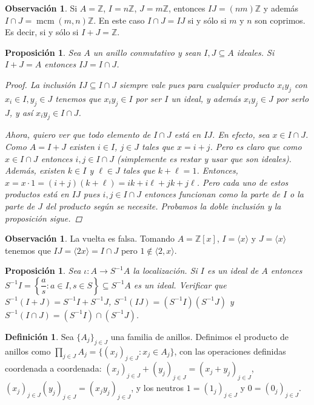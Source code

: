 \documentclass[12pt]{book}
\newtheorem{prop}[teo]{Proposición}
\theoremstyle{definition}
\newtheorem{obs}[teo]{Observación}
\newtheorem{defn}[teo]{Definición}
\newcommand{\ZZ}{\mathbb{Z}}      %
\DeclareMathOperator{\mcm}{mcm}
\begin{document}
\begin{obs}
Si $A=\ZZ$, $I=n\ZZ$, $J=m\ZZ$, entonces $IJ=(nm)\ZZ$ y además $I\cap J = \mcm (m,n)\ZZ$. En este caso $I\cap J=IJ$ si y sólo si $m$ y $n$ son coprimos. Es decir, si y sólo si $I+J=\ZZ$.
\end{obs}

\begin{prop}
Sea $A$ un anillo conmutativo y sean $I,J\subseteq A$ ideales. Si $I+J=A$ entonces $IJ=I\cap J$.
\begin{proof}
La inclusión $IJ\subseteq I\cap J$ siempre vale pues para cualquier producto $x_iy_j$ con $x_i\in I, y_j\in J$ tenemos que $x_i y_j\in I$ por ser $I$ un ideal, y además $x_iy_j\in J$ por serlo $J$, y así $x_iy_j\in I\cap J$.

Ahora, quiero ver que todo elemento de $I\cap J$ está en $IJ$. En efecto, sea $x\in I\cap J$. Como $A=I+J$ existen $i\in I$, $j\in J$ tales que $x = i+j$. Pero es claro que como $x\in I\cap J$ entonces $i,j\in I\cap J$ (simplemente es restar y usar que son ideales). Además, existen $k\in I$ y $\ell\in J$ tales que $k+\ell = 1$. Entonces, $x = x\cdot 1 = (i+j)(k+\ell) = ik + i\ell + jk + j\ell$. Pero cada uno de estos productos está en $IJ$ pues $i,j\in I\cap J$ entonces funcionan como la parte de $I$ o la parte de $J$ del producto según se necesite. Probamos la doble inclusión y la proposición sigue.

\end{proof}
\end{prop}

\begin{obs}
La vuelta es falsa. Tomando $A=\ZZ[x]$, $I=\langle x\rangle$ y $J=\langle x\rangle$ tenemos que $IJ=\langle 2x\rangle = I\cap J$ pero $1\notin \langle 2,x\rangle$.
\end{obs}


\begin{prop}
Sea $\iota:A\to S^{-1}A$ la localización. Si $I$ es un ideal de $A$ entonces $S^{-1}I = \left\{\dfrac{a}{s}:a\in I, s\in S\right\}\subseteq S^{-1}A$ es un ideal. Verificar que $S^{-1}(I+J) = S^{-1}I + S^{-1}J$, $S^{-1}(IJ) = (S^{-1}I)(S^{-1}J)$ y $S^{-1}(I\cap J) = (S^{-1}I)\cap (S^{-1}J)$.
\end{prop}

\begin{defn}
Sea $\{A_j\}_{j\in J}$ una familia de anillos. Definimos el producto de anillos como $\displaystyle\prod_{j\in J}A_j = \{(x_j)_{j\in J} : x_j\in A_j\}$, con las operaciones definidas coordenada a coordenada: $(x_j)_{j\in J} + (y_j)_{j\in J} = (x_j+y_j)_{j\in J}$, $(x_j)_{j\in J}(y_j)_{j\in J} = (x_jy_j)_{j\in J}$, y los neutros $1=(1_j)_{j\in J}$ y $0=(0_j)_{j\in J}$.
\end{defn}
\end{document}
